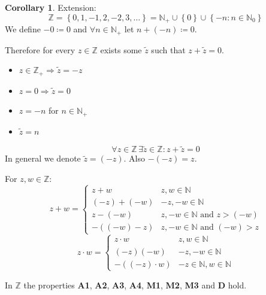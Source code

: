 \documentclass[a4paper,landscape,twocolumn]{article}
\theoremstyle{definition}
\newtheorem{cor}{Corollary}
\newcommand\set[1]{\left\{#1\right\}}
\begin{document}
\begin{cor}
  Extension:
  \[ \mathbb{Z} = \set{0, 1, -1, 2, -2, 3, \ldots} = \mathbb{N}_+ \cup \set{0} \cup \set{-n: n \in \mathbb N_0} \]
  We define $-0 \coloneqq 0$ and $\forall n \in \mathbb{N}_+$ let $n + (-n) \coloneqq 0$.

  Therefore for every $z \in \mathbb{Z}$ exists some $\tilde z$ such that $z + \tilde z = 0$.
  \begin{itemize}
    \item $z \in \mathbb{Z}_+ \Rightarrow \tilde z = -z$
    \item $z = 0 \Rightarrow \tilde z = 0$
    \item $z = -n$ for $n \in \mathbb{N}_+$
    \item $\tilde z = n$
  \end{itemize}
  \[ \forall z \in \mathbb{Z} \, \exists \tilde z \in \mathbb{Z}: z + \tilde z = 0 \]
  In general we denote $\tilde z = (-z)$.
  Also $-(-z) = z$.

  For $z,w \in \mathbb{Z}$:
  \[
    z + w =
    \begin{cases}
      z + w       & z,w \in \mathbb{N} \\
      (-z) + (-w) & -z, -w \in \mathbb{N} \\
      z - (-w)    & z, -w \in \mathbb{N} \text{ and } z > (-w) \\
      -((-w) - z) & z, -w \in \mathbb{N} \text{ and } (-w) > z
    \end{cases}
  \] \[
    z\cdot w =
    \begin{cases}
      z \cdot w       & z,w \in \mathbb{N} \\
      (-z)(-w)        & -z, -w \in \mathbb{N} \\
      -((-z) \cdot w) & -z \in \mathbb{N}, w \in \mathbb{N}
    \end{cases}
  \]

  In $\mathbb{Z}$ the properties \textbf{A1}, \textbf{A2}, \textbf{A3}, \textbf{A4},
  \textbf{M1}, \textbf{M2}, \textbf{M3} and \textbf{D} hold.
\end{cor}
\end{document}
